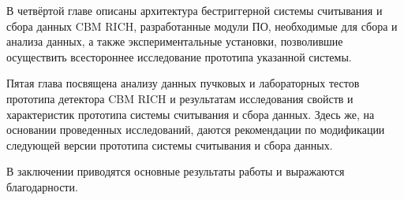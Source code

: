 В четвёртой главе
описаны архитектура бестриггерной системы считывания и сбора данных CBM RICH, разработанные модули ПО, необходимые для сбора и анализа данных, а также экспериментальные установки, позволившие осуществить всестороннее исследование прототипа указанной системы.

Пятая глава
посвящена анализу данных пучковых и лабораторных тестов прототипа детектора CBM RICH и результатам исследования свойств и характеристик прототипа системы считывания и сбора данных. Здесь же, на основании проведенных исследований, даются рекомендации по модификации следующей версии прототипа системы считывания и сбора данных.

В заключении приводятся основные результаты работы и выражаются благодарности.
